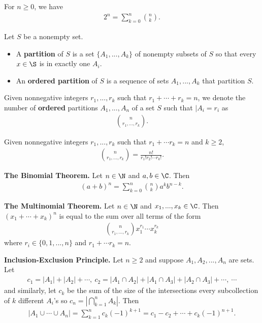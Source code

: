 \documentclass{article}
\begin{document}
\begin{corollary}
	For $n\geq 0$, we have
	\begin{align*}
		2^n = \sum_{k=0}^n \binom{n}{k}.
	\end{align*}
\end{corollary}
\begin{definition}
	Let $S$ be a nonempty set.
	\begin{itemize}
		\item A \textbf{partition} of $S$ is a set $\{A_1,...,A_k\}$ of nonempty subsets of $S$ so that every $x\in\S$ is in exactly one $A_i$.
		\item An \textbf{ordered partition} of $S$ is a sequence of sets $A_1,...,A_k$ that partition $S$.
	\end{itemize}
\end{definition}
\begin{definition}
	Given nonnegative integers $r_1, ..., r_k$ such that $r_1+\cdots + r_k=n$, we denote the number of \textbf{ordered} partitions $A_1,..., A_n$ of a set $S$ such that $|A_i=r_i$ as
	\begin{align*}
		\binom{n}{r_1,...,r_k}.
	\end{align*}
\end{definition}
\begin{theorem}
	Given nonnegative integers $r_1, ..., r_k$ such that $r_1+\cdots r_k=n$ and $k\geq 2$,
	\begin{align*}
		\binom{n}{r_1, ..., r_k}=\frac{n!}{r_1!r_2!\cdots r_k!}.
	\end{align*}
\end{theorem}
\begin{theorem}
	\textbf{The Binomial Theorem.} Let $n\in\N$ and $a,b\in\C$. Then
	\begin{align*}
		(a+b)^n=\sum_{k=0}^n \binom{n}{k}a^kb^{n-k}.
	\end{align*}
\end{theorem}
\begin{theorem}
	\textbf{The Multinomial Theorem.} Let $n\in\N$ and $x_1, ..., x_k\in\C$. Then $(x_1+\cdots+x_k)^n$ is equal to the sum over all terms of the form
	\begin{align*}
		\binom{n}{r_1,...,r_k}x_1^{r_1}\cdots x_k^{r_k}
	\end{align*}
	where $r_i\in\{0,1,...,n\}$ and $r_1+\cdots r_k=n$.
\end{theorem}
\begin{theorem}
	\textbf{Inclusion-Exclusion Principle.} Let $n\geq 2$ and suppose $A_1, A_2, ..., A_n$ are sets. Let
	\begin{align*}
		c_1=|A_1|+|A_2|+\cdots,\:c_2=|A_1\cap A_2|+|A_1\cap A_3|+|A_2\cap A_3|+\cdots,\:\cdots
	\end{align*}
	and similarly, let $c_k$ be the sum of the size of the intersections every subcollection of $k$ different $A_i$'s so $c_n=|\bigcap_{k=1}^n A_k|$. Then
	\begin{align*}
		|A_1\cup \cdots \cup A_n| = \sum_{k=1}^n c_k (-1)^{k+1}=c_1-c_2+\cdots +c_k (-1)^{n+1}.
	\end{align*}
\end{theorem}
\end{document}
